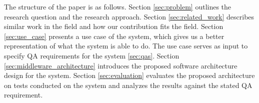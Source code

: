 The structure of the paper is as follows.
Section \ref{sec:problem} outlines the research question and the research approach.
Section \ref{sec:related_work} describes similar work in the field and how our contribution fits the field.
Section \ref{sec:use_case} presents a use case of the system, which gives us a better representation of what the system is able to do.
The use case serves as input to specify QA requirements for the system \ref{sec:qas}.
Section \ref{sec:middleware_architecture} introduces the proposed software architecture design for the system.
Section \ref{sec:evaluation} evaluates the proposed architecture on tests conducted on the system and analyzes the results against the stated QA requirement.